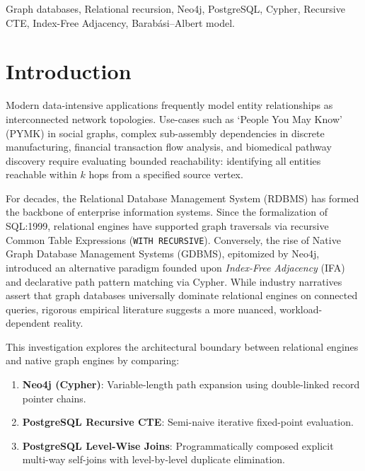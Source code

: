 \documentclass[conference,10pt]{IEEEtran}%
\begin{document}
\begin{IEEEkeywords}
Graph databases, Relational recursion, Neo4j, PostgreSQL, Cypher, Recursive CTE, Index-Free Adjacency, Barab\'asi--Albert model.
\end{IEEEkeywords}

\section{Introduction}
Modern data-intensive applications frequently model entity relationships as interconnected network topologies. Use-cases such as `People You May Know' (PYMK) in social graphs, complex sub-assembly dependencies in discrete manufacturing, financial transaction flow analysis, and biomedical pathway discovery require evaluating bounded reachability: identifying all entities reachable within $k$ hops from a specified source vertex.

For decades, the Relational Database Management System (RDBMS) has formed the backbone of enterprise information systems. Since the formalization of SQL:1999, relational engines have supported graph traversals via recursive Common Table Expressions (\texttt{WITH RECURSIVE}). Conversely, the rise of Native Graph Database Management Systems (GDBMS), epitomized by Neo4j, introduced an alternative paradigm founded upon \textit{Index-Free Adjacency} (IFA) and declarative path pattern matching via Cypher. While industry narratives assert that graph databases universally dominate relational engines on connected queries, rigorous empirical literature suggests a more nuanced, workload-dependent reality.

This investigation explores the architectural boundary between relational engines and native graph engines by comparing:
\begin{enumerate}
    \item \textbf{Neo4j (Cypher)}: Variable-length path expansion using double-linked record pointer chains.
    \item \textbf{PostgreSQL Recursive CTE}: Semi-naive iterative fixed-point evaluation.
    \item \textbf{PostgreSQL Level-Wise Joins}: Programmatically composed explicit multi-way self-joins with level-by-level duplicate elimination.
\end{enumerate}
\end{document}

